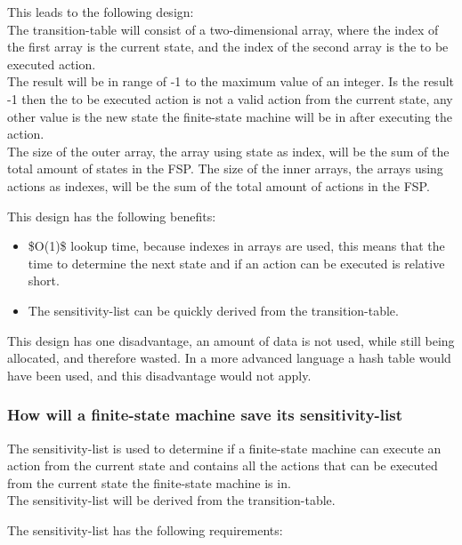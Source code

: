 This leads to the following design:\\
The transition-table will consist of a two-dimensional array, where the
index of the first array is the current state, and the index of the
second array is the to be executed action.\\
The result will be in range of -1 to the maximum value of an integer. Is
the result -1 then the to be executed action is not a valid action from
the current state, any other value is the new state the finite-state
machine will be in after executing the action.\\
The size of the outer array, the array using state as index, will be the
sum of the total amount of states in the FSP. The size of the inner
arrays, the arrays using actions as indexes, will be the sum of the
total amount of actions in the FSP.

This design has the following benefits:

\begin{itemize}
\tightlist
\item
  \$O(1)\$ lookup time, because indexes in arrays are used, this means
  that the time to determine the next state and if an action can be
  executed is relative short.
\item
  The sensitivity-list can be quickly derived from the transition-table.
\end{itemize}

This design has one disadvantage, an amount of data is not used, while
still being allocated, and therefore wasted. In a more advanced language
a hash table would have been used, and this disadvantage would not
apply.

\hypertarget{how-will-a-finite-state-machine-save-its-sensitivity-list}{%
\subsubsection{How will a finite-state machine save its
sensitivity-list}\label{how-will-a-finite-state-machine-save-its-sensitivity-list}}

The sensitivity-list is used to determine if a finite-state machine can
execute an action from the current state and contains all the actions
that can be executed from the current state the finite-state machine is
in.\\
The sensitivity-list will be derived from the transition-table.

The sensitivity-list has the following requirements:

